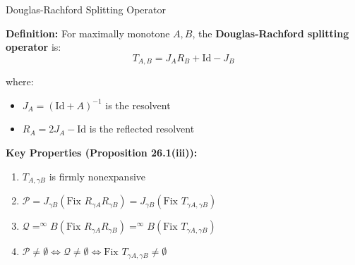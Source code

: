 \documentclass[aspectratio=169,10pt]{beamer}
\begin{document}
\begin{frame}{Douglas-Rachford Splitting Operator}

\textbf{Definition:} For maximally monotone $A, B$, the \textbf{Douglas-Rachford splitting operator} is:
\[ T_{A,B} = J_A R_B + \text{Id} - J_B \]

where:
\begin{itemize}
  \item $J_A = (\text{Id} + A)^{-1}$ is the resolvent
  \item $R_A = 2J_A - \text{Id}$ is the reflected resolvent
\end{itemize}

\vspace{0.3cm}
\textbf{Key Properties (Proposition 26.1(iii)):}

\begin{enumerate}
  \item[(a)] $T_{A,\gamma B}$ is firmly nonexpansive

  \item[(b)] $\mathcal{P} = J_{\gamma B}(\text{Fix } R_{\gamma A}R_{\gamma B}) = J_{\gamma B}(\text{Fix } T_{\gamma A,\gamma B})$

  \item[(c)] $\mathcal{Q} = ^{\infty}B(\text{Fix } R_{\gamma A}R_{\gamma B}) = ^{\infty}B(\text{Fix } T_{\gamma A,\gamma B})$

  \item[(d)] $\mathcal{P} \neq \emptyset \Leftrightarrow \mathcal{Q} \neq \emptyset \Leftrightarrow \text{Fix } T_{\gamma A,\gamma B} \neq \emptyset$
\end{enumerate}

\end{frame}
\end{document}
